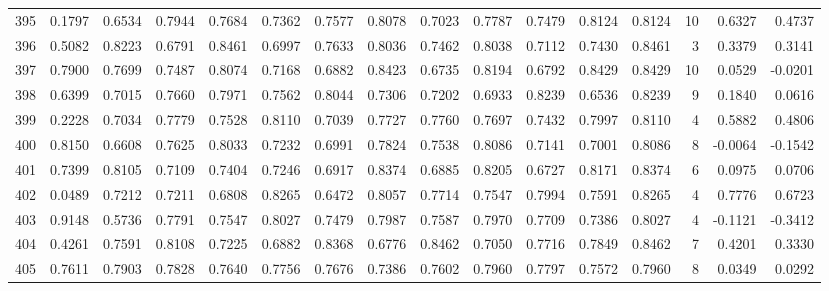\begin{tabular}{lrrrrrrrrrrrrrrr}
395 &      0.1797 &  0.6534 &  0.7944 &  0.7684 &  0.7362 &  0.7577 &  0.8078 &  0.7023 &  0.7787 &  0.7479 &   0.8124 &     0.8124 &     10 &                    0.6327 &                     0.4737 \\
396 &      0.5082 &  0.8223 &  0.6791 &  0.8461 &  0.6997 &  0.7633 &  0.8036 &  0.7462 &  0.8038 &  0.7112 &   0.7430 &     0.8461 &      3 &                    0.3379 &                     0.3141 \\
397 &      0.7900 &  0.7699 &  0.7487 &  0.8074 &  0.7168 &  0.6882 &  0.8423 &  0.6735 &  0.8194 &  0.6792 &   0.8429 &     0.8429 &     10 &                    0.0529 &                    -0.0201 \\
398 &      0.6399 &  0.7015 &  0.7660 &  0.7971 &  0.7562 &  0.8044 &  0.7306 &  0.7202 &  0.6933 &  0.8239 &   0.6536 &     0.8239 &      9 &                    0.1840 &                     0.0616 \\
399 &      0.2228 &  0.7034 &  0.7779 &  0.7528 &  0.8110 &  0.7039 &  0.7727 &  0.7760 &  0.7697 &  0.7432 &   0.7997 &     0.8110 &      4 &                    0.5882 &                     0.4806 \\
400 &      0.8150 &  0.6608 &  0.7625 &  0.8033 &  0.7232 &  0.6991 &  0.7824 &  0.7538 &  0.8086 &  0.7141 &   0.7001 &     0.8086 &      8 &                   -0.0064 &                    -0.1542 \\
401 &      0.7399 &  0.8105 &  0.7109 &  0.7404 &  0.7246 &  0.6917 &  0.8374 &  0.6885 &  0.8205 &  0.6727 &   0.8171 &     0.8374 &      6 &                    0.0975 &                     0.0706 \\
402 &      0.0489 &  0.7212 &  0.7211 &  0.6808 &  0.8265 &  0.6472 &  0.8057 &  0.7714 &  0.7547 &  0.7994 &   0.7591 &     0.8265 &      4 &                    0.7776 &                     0.6723 \\
403 &      0.9148 &  0.5736 &  0.7791 &  0.7547 &  0.8027 &  0.7479 &  0.7987 &  0.7587 &  0.7970 &  0.7709 &   0.7386 &     0.8027 &      4 &                   -0.1121 &                    -0.3412 \\
404 &      0.4261 &  0.7591 &  0.8108 &  0.7225 &  0.6882 &  0.8368 &  0.6776 &  0.8462 &  0.7050 &  0.7716 &   0.7849 &     0.8462 &      7 &                    0.4201 &                     0.3330 \\
405 &      0.7611 &  0.7903 &  0.7828 &  0.7640 &  0.7756 &  0.7676 &  0.7386 &  0.7602 &  0.7960 &  0.7797 &   0.7572 &     0.7960 &      8 &                    0.0349 &                     0.0292 \\

\end{tabular}
